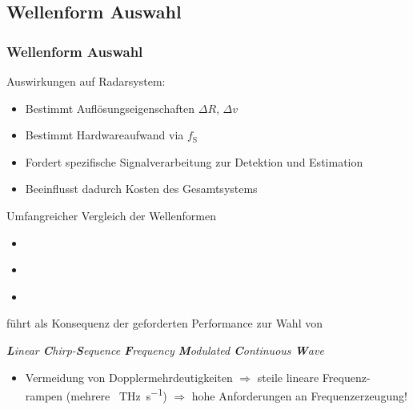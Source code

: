 \documentclass[16pt]{beamer}
\begin{document}
\subsection{Wellenform Auswahl}
\begin{frame}
\frametitle{Wellenform Auswahl}
\small
Auswirkungen auf Radarsystem:
\begin{itemize}
	\item Bestimmt Auflösungseigenschaften $\Delta R$, $\Delta v$ 
	\item Bestimmt Hardwareaufwand via $f_{\mathrm{S}}$
	\item Fordert spezifische Signalverarbeitung zur Detektion und Estimation
	\item Beeinflusst dadurch Kosten des Gesamtsystems 
\end{itemize} 
\pause
Umfangreicher Vergleich der Wellenformen
\begin{itemize}
	\item{} %
	\item{ \cite{fink2015shortpaper,fink2015ofdmcs}}
	\item{ \cite{fink2015shortpaper,fink2015ofdmcs}}
\end{itemize} 
führt als Konsequenz der geforderten Performance zur Wahl von 
\begin{exampleblock}{}
	\emph{\textbf{L}inear \textbf{C}hirp-\textbf{S}equence \textbf{F}requency \textbf{M}odulated \textbf{C}ontinuous \textbf{W}ave} 
\end{exampleblock}
\pause
\begin{itemize}
	\item Vermeidung von Dopplermehrdeutigkeiten $\Rightarrow$ steile lineare Frequenz- rampen (mehrere \SI{}{\tera\hertz\per\second}) $\Rightarrow$ hohe Anforderungen an Frequenzerzeugung!
\end{itemize}


\end{frame}
\end{document}

